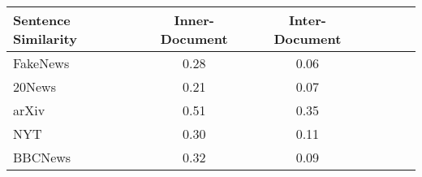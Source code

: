 \small
\begin{tabular}{l|cccccc}
\toprule
Sentence Similarity  &Inner-Document  &Inter-Document\\
\midrule
FakeNews &0.28 &0.06 \\
20News &0.21 &0.07 \\
arXiv &0.51 &0.35\\
NYT &0.30 &0.11 \\
BBCNews &0.32 &0.09 \\
\bottomrule
\end{tabular}